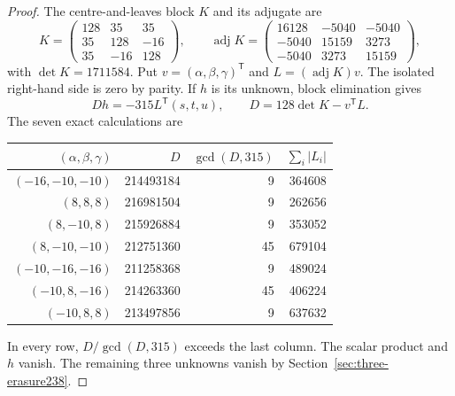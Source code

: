 \documentclass[11pt,a4paper]{article}
\theoremstyle{definition}
\theoremstyle{remark}
\begin{document}
\begin{proof}
The centre-and-leaves block $K$ and its adjugate are
\[
K=\begin{pmatrix}128&35&35\\35&128&-16\\35&-16&128\end{pmatrix},
\qquad
\operatorname{adj}K=
\begin{pmatrix}
16128&-5040&-5040\\-5040&15159&3273\\-5040&3273&15159
\end{pmatrix},
\]
with $\det K=1711584$. Put
$v=(\alpha,\beta,\gamma)^{\mathsf T}$ and $L=(\operatorname{adj}K)v$.
The isolated right-hand side is zero by parity. If $h$ is its unknown,
block elimination gives
\[
D h=-315L^{\mathsf T}(s,t,u),\qquad
D=128\det K-v^{\mathsf T}L.
\]
The seven exact calculations are
\begin{center}
\begin{tabular}{rrrr}
\toprule
$(\alpha,\beta,\gamma)$ & $D$ & $\gcd(D,315)$ & $\sum_i|L_i|$\\
\midrule
$(-16,-10,-10)$ & 214493184 & 9 & 364608\\
$(8,8,8)$ & 216981504 & 9 & 262656\\
$(8,-10,8)$ & 215926884 & 9 & 353052\\
$(8,-10,-10)$ & 212751360 & 45 & 679104\\
$(-10,-16,-16)$ & 211258368 & 9 & 489024\\
$(-10,8,-16)$ & 214263360 & 45 & 406224\\
$(-10,8,8)$ & 213497856 & 9 & 637632\\
\bottomrule
\end{tabular}
\end{center}
In every row, $D/\gcd(D,315)$ exceeds the last column. The scalar
product and $h$ vanish. The remaining three unknowns vanish by
Section~\ref{sec:three-erasure238}.


\end{proof}
\end{document}

